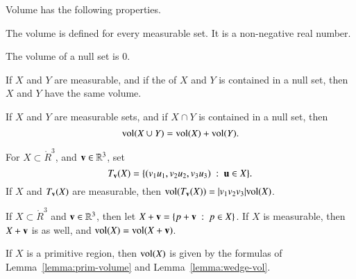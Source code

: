 \begin{lemma}[volume]\label{lemma:volume} 
Volume  has the following properties.
%
\begin{nomerate}%
\item {} The volume is defined for every measurable set.  It is
a non-negative real number.
\item {} The volume of a null set is $0$.
\item {} If $X$ and $Y$ are  measurable, and if
the  of
$X$ and $Y$ is contained in a null set, then 
$X$ and $Y$ have the same volume.  
\item {} If $X$ and $Y$ are measurable sets, and if $X\cap
Y$ is contained in a null set, then
\begin{displaymath}
{\operatorname{vol}}(X\cup Y) = {\operatorname{vol}}(X) + {\operatorname{vol}}(Y).
\end{displaymath}
%
%
\item {} For $X\subset \ring{R}^3$, and
${\mathbf v}\in\mathbb{R}^3$, set
\begin{displaymath}
T_{\mathbf v}(X) = \{ (v_1u_1,v_2u_2,v_3u_3) \ :\  {\mathbf u}\in X\}.
\end{displaymath}
%
If $X$ and $T_{\mathbf v}(X)$ are measurable, then
${\operatorname{vol}}(T_{\mathbf v}(X)) = |v_1v_2v_3|{\operatorname{vol}}(X)$.
\item {} If $X\subset \ring{R}^3$ and ${\mathbf v}\in\mathbb{R}^3$,
then let $X+{\mathbf v} = \{p + {\mathbf v}\ :\  p\in X\}$.  If $X$ is measurable,
then $X+{\mathbf v}$ is as well, and ${\operatorname{vol}}(X) = {\operatorname{vol}}(X+{\mathbf v})$.
\item {} If $X$ is a primitive region, then 
 ${\operatorname{vol}}(X)$ is given by the formulas of
Lemma~\ref{lemma:prim-volume} and Lemma~\ref{lemma:wedge-vol}.  
\end{nomerate}
\end{lemma}
%
%
%

